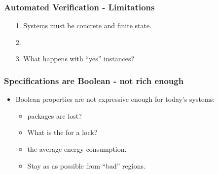\begin{frame}
\frametitle{Automated Verification - Limitations}
\begin{itemize}
\item[1. \xmark] Systems must be concrete and finite state.
\begin{itemize}
\item[]
\end{itemize}
\item[2. \xmark] 
\begin{itemize}
\item[]
\end{itemize}
\item[3. \xmark] What happens with ``yes'' instances?
\begin{itemize}
\item[] 
\end{itemize}
\end{itemize}
\pause
\end{frame}

\begin{frame}
\frametitle{Specifications are Boolean - not rich enough}
\begin{itemize}
\item Boolean properties are not expressive enough for today's systems:
\begin{itemize}
\item {} packages are lost?
\item What is the  for a lock?
\item {} the average energy consumption.
\item Stay as  as possible from ``bad'' regions.
\end{itemize}
\end{itemize}
\end{frame}

